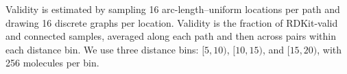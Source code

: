 Validity is estimated by sampling 16 arc-length--uniform locations per path and drawing 16
discrete graphs per location. Validity is the fraction of RDKit-valid and connected samples, averaged
along each path and then across pairs within each distance bin. We use three distance bins:
$[5,10)$, $[10,15)$, and $[15,20)$, with 256 molecules per bin.
